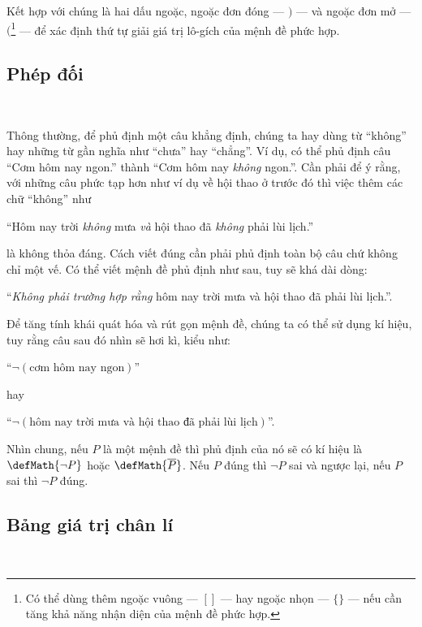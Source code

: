 Kết hợp với chúng là hai dấu ngoặc, ngoặc đơn đóng --- $)$ --- và ngoặc đơn mở --- $($\footnote{Có thể dùng thêm ngoặc vuông --- $[]$ --- hay ngoặc nhọn --- $\{\}$ --- nếu cần tăng khả năng nhận diện của mệnh đề phức hợp.} --- để xác định thứ tự giải giá trị lô-gích của mệnh đề phức hợp.

\subsection{Phép đối}

\ %

Thông thường, để phủ định một câu khẳng định, chúng ta hay dùng từ ``không'' hay những từ gần nghĩa như ``chưa'' hay ``chẳng''. Ví dụ, có thể phủ định câu ``Cơm hôm nay ngon.'' thành ``Cơm hôm nay \emph{không} ngon.''. Cần phải để ý rằng, với những câu phức tạp hơn như ví dụ về hội thao ở trước đó thì việc thêm các chữ ``không'' như
\begin{center}
   ``Hôm nay trời \emph{không} mưa \emph{\textcolor{colorEmphasis}{và}} hội thao đã \emph{không} phải lùi lịch.''
\end{center}
là không thỏa đáng. Cách viết đúng cần phải phủ định toàn bộ câu chứ không chỉ một vế. Có thể viết mệnh đề phủ định như sau, tuy sẽ khá dài dòng:
\begin{center}
   ``\emph{Không phải trường hợp rằng} hôm nay trời mưa và hội thao đã phải lùi lịch.''.
\end{center}
Để tăng tính khái quát hóa và rút gọn mệnh đề, chúng ta có thể sử dụng kí hiệu, tuy rằng câu sau đó nhìn sẽ hơi kì, kiểu như:
\begin{center}
   ``$\neg \left(\text{cơm hôm nay ngon}\right)$''
\end{center}
hay
\begin{center}
   ``$\neg \left(\text{hôm nay trời mưa và hội thao đã phải lùi lịch}\right)$''.
\end{center}
Nhìn chung, nếu $P$ là một mệnh đề thì phủ định của nó sẽ có kí hiệu là $\defMath{\neg P}$ hoặc $\defMath{\overline{P}}$. Nếu $P$ đúng thì $\neg P$ sai và ngược lại, nếu $P$ sai thì $\neg P$ đúng.

\subsection{Bảng giá trị chân lí}

\ %

